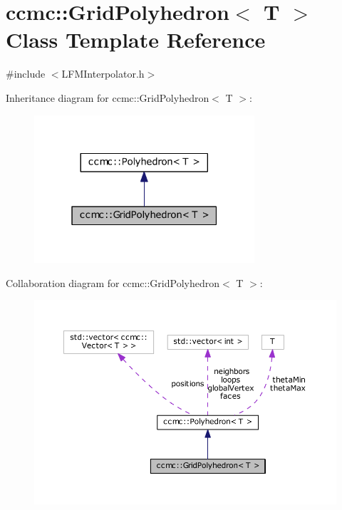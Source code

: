 \hypertarget{classccmc_1_1_grid_polyhedron}{\section{ccmc\-:\-:Grid\-Polyhedron$<$ T $>$ Class Template Reference}
\label{classccmc_1_1_grid_polyhedron}
}


{\ttfamily \#include $<$L\-F\-M\-Interpolator.\-h$>$}



Inheritance diagram for ccmc\-:\-:Grid\-Polyhedron$<$ T $>$\-:
\nopagebreak
\begin{figure}[H]
\begin{center}
\leavevmode
\includegraphics[width=232pt]{classccmc_1_1_grid_polyhedron__inherit__graph}
\end{center}
\end{figure}


Collaboration diagram for ccmc\-:\-:Grid\-Polyhedron$<$ T $>$\-:
\nopagebreak
\begin{figure}[H]
\begin{center}
\leavevmode
\includegraphics[width=350pt]{classccmc_1_1_grid_polyhedron__coll__graph}
\end{center}
\end{figure}
